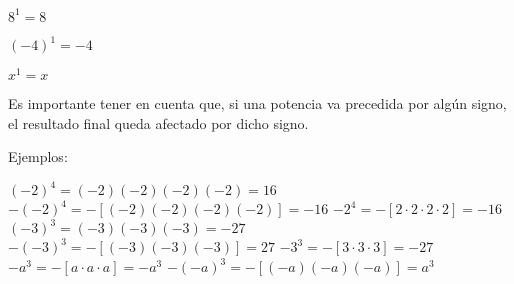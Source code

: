 \begin{ejemplos}[1][\textbullet]
  \task $8^1 = 8$
  \item[] $(-4)^1 = -4$
  \item[] $x^1 = x$
\end{ejemplos}




Es importante tener en cuenta que, si una potencia va precedida por
algún signo, el resultado final queda afectado por dicho signo.  

Ejemplos:

\begin{ejemplos}[1][\textbullet]
  \task $(-2)^4 = (-2)(-2)(-2)(-2) = 16$
  \task $-(-2)^4 = -[(-2)(-2)(-2)(-2)] = -16$
  \task $-2^4 = -[2 \cdot 2 \cdot 2 \cdot 2] = -16$
  \task $(-3)^3 = (-3)(-3)(-3) = -27$
  \task $-(-3)^3 = -[(-3)(-3)(-3)] = 27$
  \task $-3^3 = -[3 \cdot 3 \cdot 3] = -27$
  \task $-a^3 = -[a \cdot a \cdot a] = -a^3$
  \task $-(-a)^3 = -[(-a)(-a)(-a)] = a^3$
\end{ejemplos}









